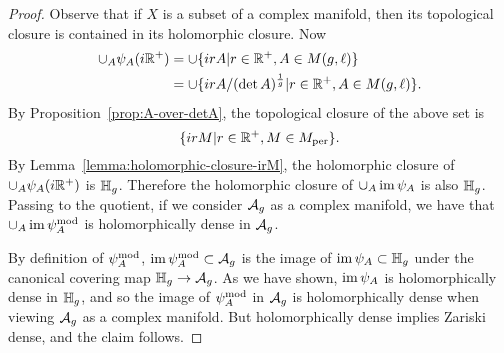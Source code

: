 \documentclass{amsart}
\begin{document}
\begin{proof}
  Observe that if $X$ is a subset of a complex manifold, then its topological closure is contained in its holomorphic closure. Now
  \begin{align*}
    \cup_A \psi_A(i\mathbb{R}^+) &= \cup \{irA | r \in \mathbb{R}^+, A \in M(g,\ell)\} \\
               &= \cup \{irA/(\det A)^{\frac{1}{g}} | r \in \mathbb{R}^+, A \in M(g,\ell)\}.
  \end{align*}
  By Proposition~\ref{prop:A-over-detA}, the topological closure of the above set is
  \[
    \{irM | r \in \mathbb{R}^+, M \in M_{\textrm{per}}\}.
  \]
  By Lemma~\ref{lemma:holomorphic-closure-irM}, the holomorphic closure of $\cup_A \psi_A(i\mathbb{R}^+)$ is $\mathbb{H}_g$. Therefore the holomorphic closure of $\cup_A \operatorname{im} \psi_A$ is also $\mathbb{H}_g$. Passing to the quotient, if we consider $\mathcal{A}_g$ as a complex manifold, we have that $\cup_A \operatorname{im} \psi_{A}^\mathrm{mod}$ is holomorphically dense in $\mathcal{A}_g$.

  By definition of $\psi_{A}^\mathrm{mod}$,  $\operatorname{im} \psi_{A}^\mathrm{mod} \subset \mathcal{A}_g$ is the image of $\operatorname{im} \psi_A \subset \mathbb{H}_g$ under the canonical covering map $\mathbb{H}_g \to \mathcal{A}_g$. As we have shown, $\operatorname{im} \psi_A$ is holomorphically dense in $\mathbb{H}_g$, and so the image of $\psi_{A}^\mathrm{mod}$ in $\mathcal{A}_g$ is holomorphically dense when viewing $\mathcal{A}_g$ as a complex manifold. But holomorphically dense implies Zariski dense, and the claim follows.
\end{proof}



\end{document}
